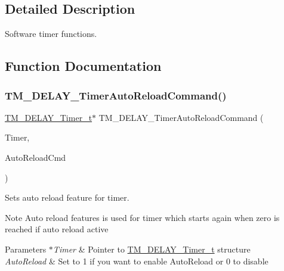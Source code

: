 \subsection{Detailed Description}
Software timer functions. 



\subsection{Function Documentation}
\mbox{\label{group___t_m___d_e_l_a_y___timer___functions_ga4a62180a12d19b372b3da3d98898d9d3}} 
\subsubsection{\texorpdfstring{T\+M\+\_\+\+D\+E\+L\+A\+Y\+\_\+\+Timer\+Auto\+Reload\+Command()}{TM\_DELAY\_TimerAutoReloadCommand()}}
{\footnotesize\ttfamily \hyperlink{group___t_m___d_e_l_a_y___typedefs_gaf0beeb077a757f34c8b176464d9a0e85}{T\+M\+\_\+\+D\+E\+L\+A\+Y\+\_\+\+Timer\+\_\+t}$\ast$ T\+M\+\_\+\+D\+E\+L\+A\+Y\+\_\+\+Timer\+Auto\+Reload\+Command (\begin{DoxyParamCaption}\item[{\hyperlink{group___t_m___d_e_l_a_y___typedefs_gaf0beeb077a757f34c8b176464d9a0e85}{T\+M\+\_\+\+D\+E\+L\+A\+Y\+\_\+\+Timer\+\_\+t} $\ast$}]{Timer,  }\item[{uint8\+\_\+t}]{Auto\+Reload\+Cmd }\end{DoxyParamCaption})}



Sets auto reload feature for timer. 

\begin{DoxyNote}{Note}
Auto reload features is used for timer which starts again when zero is reached if auto reload active 
\end{DoxyNote}

\begin{DoxyParams}{Parameters}
{\em $\ast$\+Timer} & Pointer to \hyperlink{group___t_m___d_e_l_a_y___typedefs_gaf0beeb077a757f34c8b176464d9a0e85}{T\+M\+\_\+\+D\+E\+L\+A\+Y\+\_\+\+Timer\+\_\+t} structure \\
\hline
{\em Auto\+Reload} & Set to 1 if you want to enable Auto\+Reload or 0 to disable \\
\hline
\end{DoxyParams}

